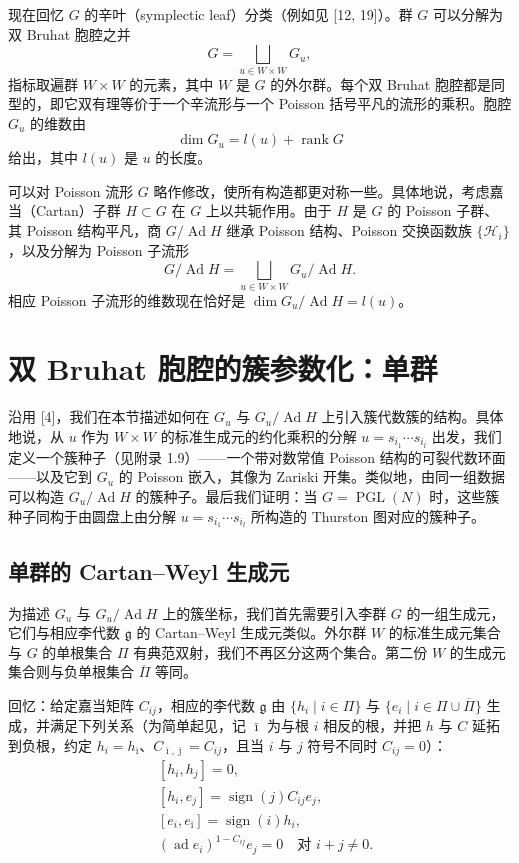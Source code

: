 现在回忆 $G$ 的辛叶（symplectic leaf）分类（例如见 [12, 19]）。群 $G$ 可以分解为双 Bruhat 胞腔之并
\[
G=\bigsqcup_{u\in W\times W}G_u,
\]
指标取遍群 $W\times W$ 的元素，其中 $W$ 是 $G$ 的外尔群。每个双 Bruhat 胞腔都是同型的，即它双有理等价于一个辛流形与一个 Poisson 括号平凡的流形的乘积。胞腔 $G_u$ 的维数由
\[
\dim G_u=l(u)+\operatorname{rank}G
\]
给出，其中 $l(u)$ 是 $u$ 的长度。

可以对 Poisson 流形 $G$ 略作修改，使所有构造都更对称一些。具体地说，考虑嘉当（Cartan）子群 $H\subset G$ 在 $G$ 上以共轭作用。由于 $H$ 是 $G$ 的 Poisson 子群、其 Poisson 结构平凡，商 $G/\operatorname{Ad}H$ 继承 Poisson 结构、Poisson 交换函数族 $\{\mathcal H_i\}$，以及分解为 Poisson 子流形
\[
G/\operatorname{Ad}H=\bigsqcup_{u\in W\times W}G_u/\operatorname{Ad}H.
\]
相应 Poisson 子流形的维数现在恰好是 $\dim G_u/\operatorname{Ad}H=l(u)$。

\section{双 Bruhat 胞腔的簇参数化：单群}

沿用 [4]，我们在本节描述如何在 $G_u$ 与 $G_u/\operatorname{Ad}H$ 上引入簇代数簇的结构。具体地说，从 $u$ 作为 $W\times W$ 的标准生成元的约化乘积的分解 $u=s_{i_1}\cdots s_{i_l}$ 出发，我们定义一个簇种子（见附录 1.9）——一个带对数常值 Poisson 结构的可裂代数环面——以及它到 $G_u$ 的 Poisson 嵌入，其像为 Zariski 开集。类似地，由同一组数据可以构造 $G_u/\operatorname{Ad}H$ 的簇种子。最后我们证明：当 $G=\operatorname{PGL}(N)$ 时，这些簇种子同构于由圆盘上由分解 $u=s_{i_1}\cdots s_{i_l}$ 所构造的 Thurston 图对应的簇种子。

\subsection{单群的 Cartan--Weyl 生成元}

为描述 $G_u$ 与 $G_u/\operatorname{Ad}H$ 上的簇坐标，我们首先需要引入李群 $G$ 的一组生成元，它们与相应李代数 $\mathfrak g$ 的 Cartan--Weyl 生成元类似。外尔群 $W$ 的标准生成元集合与 $G$ 的单根集合 $\Pi$ 有典范双射，我们不再区分这两个集合。第二份 $W$ 的生成元集合则与负单根集合 $\overline\Pi$ 等同。

回忆：给定嘉当矩阵 $C_{ij}$，相应的李代数 $\mathfrak g$ 由 $\{h_i\mid i\in\Pi\}$ 与 $\{e_i\mid i\in\Pi\cup\overline\Pi\}$ 生成，并满足下列关系（为简单起见，记 $\bar\imath$ 为与根 $i$ 相反的根，并把 $h$ 与 $C$ 延拓到负根，约定 $h_i=h_{\bar\imath}$、$C_{\bar\imath,\bar\jmath}=C_{ij}$，且当 $i$ 与 $j$ 符号不同时 $C_{ij}=0$）：
\begin{equation}\label{eq:1.3}
\begin{aligned}
&[h_i,h_j]=0,\\
&[h_i,e_j]=\operatorname{sign}(j)C_{ij}e_j,\\
&[e_i,e_{\bar\imath}]=\operatorname{sign}(i)h_i,\\
&(\operatorname{ad}e_i)^{1-C_{ij}}e_j=0\quad\text{对 } i+j\neq0.
\end{aligned}
\tag{1.3}
\end{equation}

